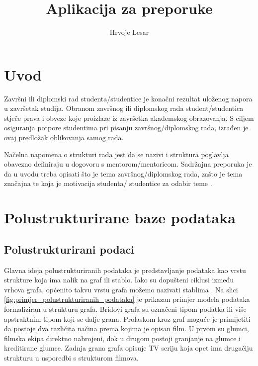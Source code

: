 \documentclass[]{foi}
\title{Aplikacija za preporuke}
\author{Hrvoje Lesar}
\begin{document}
\maketitle

\tableofcontents

\makeatletter {} \makeatother
\pagestyle{plain}



\chapter{Uvod}

Završni ili diplomski rad studenta/studentice je konačni rezultat uloženog napora u završetak studija.
Obranom završnog ili diplomskog rada student/studentica stječe prava i obveze koje proizlaze iz završetka akademskog obrazovanja.
S ciljem osiguranja potpore studentima pri pisanju završnog/diplomskog rada, izrađen je ovaj predložak oblikovanja samog rada.

Načelna napomena o strukturi rada jest da se nazivi i struktura poglavlja obavezno definiraju u dogovoru s mentorom/mentoricom.
Sadržajna preporuka je da u uvodu treba opisati što je tema završnog/diplomskog rada,
zašto je tema značajna te koja je motivacija studenta/ studentice za odabir teme \cite{oraictolic2011AkademskoPismoStrategije}.

\chapter{Polustrukturirane baze podataka}

\section{Polustrukturirani podaci}

Glavna ideja polustrukturiranih podataka je predstavljanje podataka kao vrstu strukture koja ima nalik na graf ili stablo.
Iako su dopušteni ciklusi između vrhova grafa, općenito takvu vrstu grafa možemo nazivati stablima \cite{buneman1997semistructured}.
Na slici \ref{fig:primjer_polustrukturiranih_podataka} je prikazan primjer modela podataka formaliziran u strukturu grafa.
Bridovi grafa su označeni tipom podatka ili više apstraktnim tipom koji se dalje grana. Prolaskom kroz graf moguće je
primijetiti da postoje dva različita načina prema kojima je opisan film. U prvom su glumci, filmska ekipa direktno nabrojeni,
dok u drugom postoji granjanje na glumce i kreditirane glumce. Zadnja grana grafa opisuje TV seriju koja opet ima drugačiju
strukturu u usporedbi s strukturom filmova.
\end{document}
